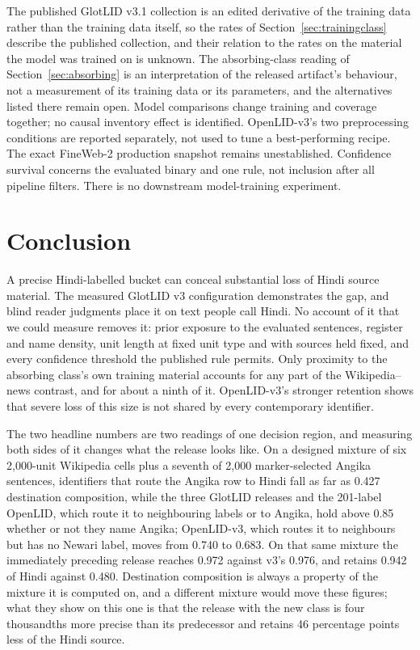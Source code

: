 \documentclass[final]{clv2025}
\begin{document}
The published GlotLID v3.1 collection is an edited derivative of the training data rather than the training data itself, so the rates of Section~\ref{sec:trainingclass} describe the published collection, and their relation to the rates on the material the model was trained on is unknown. The absorbing-class reading of Section~\ref{sec:absorbing} is an interpretation of the released artifact's behaviour, not a measurement of its training data or its parameters, and the alternatives listed there remain open. Model comparisons change training and coverage together; no causal inventory effect is identified. OpenLID-v3's two preprocessing conditions are reported separately, not used to tune a best-performing recipe. The exact FineWeb-2 production snapshot remains unestablished. Confidence survival concerns the evaluated binary and one rule, not inclusion after all pipeline filters. There is no downstream model-training experiment.

\section{Conclusion}

A precise Hindi-labelled bucket can conceal substantial loss of Hindi source material. The measured GlotLID v3 configuration demonstrates the gap, and blind reader judgments place it on text people call Hindi. No account of it that we could measure removes it: prior exposure to the evaluated sentences, register and name density, unit length at fixed unit type and with sources held fixed, and every confidence threshold the published rule permits. Only proximity to the absorbing class's own training material accounts for any part of the Wikipedia--news contrast, and for about a ninth of it. OpenLID-v3's stronger retention shows that severe loss of this size is not shared by every contemporary identifier.

The two headline numbers are two readings of one decision region, and measuring both sides of it changes what the release looks like. On a designed mixture of six 2,000-unit Wikipedia cells plus a seventh of 2,000 marker-selected Angika sentences, identifiers that route the Angika row to Hindi fall as far as 0.427 destination composition, while the three GlotLID releases and the 201-label OpenLID, which route it to neighbouring labels or to Angika, hold above 0.85 whether or not they name Angika; OpenLID-v3, which routes it to neighbours but has no Newari label, moves from 0.740 to 0.683. On that same mixture the immediately preceding release reaches 0.972 against v3's 0.976, and retains 0.942 of Hindi against 0.480. Destination composition is always a property of the mixture it is computed on, and a different mixture would move these figures; what they show on this one is that the release with the new class is four thousandths more precise than its predecessor and retains 46 percentage points less of the Hindi source.
\end{document}
